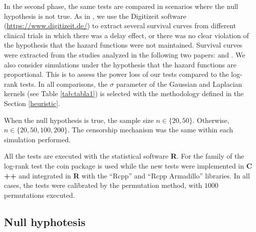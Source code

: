 \documentclass[11pt]{article}
\begin{document}
In the second phase, the same tests are compared in scenarios where the null hypothesis is not true.   As in \cite{guyot2012enhanced}, we use the Digitizeit software (\url{https://www.digitizeit.de/}) to extract several survival curves  from different clinical trials in which there was a delay effect, or  there was no clear violation of the hypothesis that the hazard functions were not maintained. Survival curves were extracted from the studies analyzed in the following two papers:  \cite{su2018time} and \cite{alexander2018hazards}. We also consider simulations under the hypothesis that the hazard functions are proportional. This is  to assess the power loss of our tests compared to the log-rank tests. In all comparisons, the $\sigma$ parameter of the Gaussian and Laplacian kernels (see Table \ref{tab:tabla1}) is selected with the methodology defined in the Section  \ref{heuristic}. 


 When the null hypothesis is true, the sample size $n\in \{20,50\}$. Otherwise, $n\in \{20,50,100,200\}$. The censorship mechanism was the same within each simulation performed.

%	

All the tests  are executed with the statistical software \textbf{\textsf{R}}. For the family of the log-rank test the coin package \cite{hothorn2008implementing} is  used while the new tests were implemented in \textbf{\textsf{C ++}} and integrated  in \textbf{\textsf{R}} with the ``Rcpp''  \cite{eddelbuettel2011rcpp} and ``Rcpp Armadillo''  libraries. In all  cases, the tests were calibrated by the permutation method, with $1000$ permutations executed.

\subsection{Null hyphotesis}
\label{sec:null}
\end{document}

